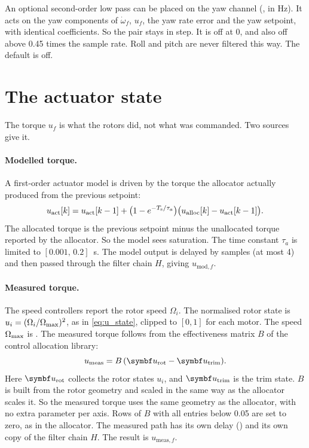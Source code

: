 An optional second-order low pass can be placed on the yaw channel (, in Hz).
It acts on the yaw components of $\dot\omega_f$, $u_f$, the yaw rate error and the yaw setpoint, with identical coefficients.
So the pair stays in step.
It is off at 0, and also off above 0.45 times the sample rate.
Roll and pitch are never filtered this way.
The default is off.

\section{The actuator state}\label{sec:inner_actuator}

The torque $u_f$ is what the rotors did, not what was commanded.
Two sources give it.

\paragraph{Modelled torque.}
A first-order actuator model is driven by the torque the allocator actually produced from the previous setpoint:
\begin{equation}\label{eq:inner_model}
  u_{\mathrm{act}}[k] = u_{\mathrm{act}}[k-1] + \bigl(1 - e^{-T_{\mathrm{s}}/\tau_a}\bigr)\bigl(u_{\mathrm{alloc}}[k] - u_{\mathrm{act}}[k-1]\bigr) .
\end{equation}
The allocated torque is the previous setpoint minus the unallocated torque reported by the allocator.
So the model sees saturation.
The time constant $\tau_a$ is limited to $[0.001,\,0.2]$~s.
The model output is delayed by  samples (at most 4) and then passed through the filter chain $H$, giving $u_{\mathrm{mod},f}$.

\paragraph{Measured torque.}
The speed controllers report the rotor speed $\Omega_i$.
The normalised rotor state is $u_i=(\Omega_i/\Omega_{\max})^2$, as in \cref{eq:u_state}, clipped to $[0,1]$ for each motor.
The speed $\Omega_{\max}$ is .
The measured torque follows from the effectiveness matrix $B$ of the control allocation library:
\begin{equation}\label{eq:inner_meas}
  u_{\mathrm{meas}} = B\,(\vect{u}_{\mathrm{rot}} - \vect{u}_{\mathrm{trim}}) .
\end{equation}
Here $\vect{u}_{\mathrm{rot}}$ collects the rotor states $u_i$, and $\vect{u}_{\mathrm{trim}}$ is the trim state.
$B$ is built from the  rotor geometry and scaled in the same way as the allocator scales it.
So the measured torque uses the same geometry as the allocator, with no extra parameter per axis.
Rows of $B$ with all entries below 0.05 are set to zero, as in the allocator.
The measured path has its own delay () and its own copy of the filter chain $H$.
The result is $u_{\mathrm{meas},f}$.

